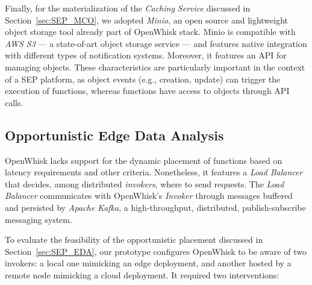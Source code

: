 
Finally, for the materialization of the \textit{Caching Service} discussed in Section~\ref{sec:SEP_MCO}, we adopted \textit{Minio}, an open source and lightweight object storage tool already part of OpenWhisk stack.
Minio is compatible with \textit{AWS S3} --- a state-of-art object storage service --- and features native integration with different types of notification systems. Moreover, it features an API for managing objects. These characteristics are particularly important in the context of a SEP platform, as object events (e.g., creation, update) can trigger the execution of functions, whereas functions have access to objects through API calls. 





\subsection{Opportunistic Edge Data Analysis}

OpenWhisk lacks support for the dynamic placement of functions based on latency requirements and other criteria. Nonetheless, it features a \textit{Load Balancer} that decides, among distributed \textit{invokers}, where to send requests. 
The \textit{Load Balancer} communicates with OpenWhisk's \textit{Invoker} through messages buffered and persisted by \textit{Apache Kafka}, a high-throughput, distributed, publish-subscribe messaging system.


To evaluate the feasibility of the opportunistic placement discussed in Section~\ref{sec:SEP_EDA}, our prototype configures OpenWhisk to be aware of two invokers: a local one mimicking an edge deployment, and another hosted by a remote node mimicking a cloud deployment. It required two interventions: 

